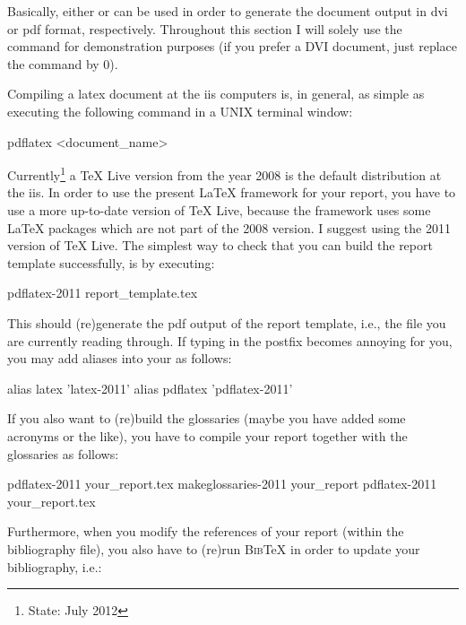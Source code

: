 Basically, either  or  can be used in
order to generate the document output in \gls{dvi} or \gls{pdf}
format, respectively. Throughout this section I will solely use the
 command for demonstration purposes (if you prefer a
DVI document, just replace the  command by
0).

Compiling a latex document at the \gls{iis} computers is, in general,
as simple as executing the following command in a UNIX terminal
window:

\begin{shellenv}
pdflatex <document_name>
\end{shellenv}

Currently\footnote{State: July 2012} a \TeX{} Live version from the
year 2008 is the default distribution at the \gls{iis}. In order to
use the present \LaTeX{} framework for your report, you have to use a
more up-to-date version of \TeX{} Live, because the framework uses
some \LaTeX{} packages which are not part of the 2008 version. I
suggest using the 2011 version of \TeX{} Live. The simplest way to
check that you can build the report template successfully, is by
executing:

\begin{shellenv}
pdflatex-2011 report_template.tex
\end{shellenv}

This should (re)generate the \gls{pdf} output of the report template,
i.e., the file you are currently reading through. If typing in the
 postfix becomes annoying for you, you may add aliases
into your  as follows:

\begin{shellenv}
alias latex 'latex-2011'
alias pdflatex 'pdflatex-2011'
\end{shellenv}

If you also want to (re)build the glossaries (maybe you have added
some acronyms or the like), you have to compile your report together
with the glossaries as follows:

\begin{shellenv}
pdflatex-2011 your_report.tex
makeglossaries-2011 your_report
pdflatex-2011 your_report.tex
\end{shellenv}

Furthermore, when you modify the references of your report (within the
bibliography file), you also have to (re)run \textsc{Bib}\TeX{} in
order to update your bibliography, i.e.:

